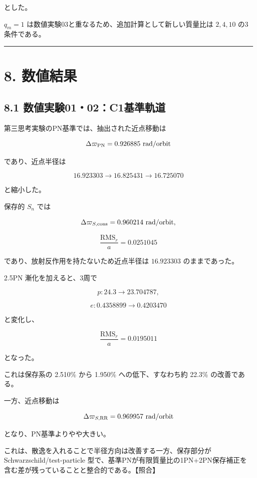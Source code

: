 \documentclass[
  a4paper,
]{ltjsarticle}
\begin{document}
とした。

\(q_m=1\) は数値実験03と重なるため、追加計算として新しい質量比は
\(2,4,10\) の3条件である。

\begin{center}\rule{0.5\linewidth}{0.5pt}\end{center}

\section{8. 数値結果}\label{ux6570ux5024ux7d50ux679c}

\subsection{8.1
数値実験01・02：C1基準軌道}\label{ux6570ux5024ux5b9fux9a130102c1ux57faux6e96ux8eccux9053}

第三思考実験のPN基準では、抽出された近点移動は

\[
\Delta\varpi_{\rm PN}=0.926885\ {\rm rad/orbit}
\]

であり、近点半径は

\[
16.923303
\rightarrow
16.825431
\rightarrow
16.725070
\]

と縮小した。

保存的 \(S_n\) では

\[
\Delta\varpi_{S,\rm cons}=0.960214\ {\rm rad/orbit},
\]

\[
\frac{\mathrm{RMS}_r}{a}=0.0251045
\]

であり、放射反作用を持たないため近点半径は \(16.923303\)
のままであった。

2.5PN 漸化を加えると、3周で

\[
p:
24.3\rightarrow23.704787,
\]

\[
e:
0.4358899\rightarrow0.4203470
\]

と変化し、

\[
\frac{\mathrm{RMS}_r}{a}
=0.0195011
\]

となった。

これは保存系の 2.510\% から 1.950\% への低下、すなわち約 22.3\%
の改善である。

一方、近点移動は

\[
\Delta\varpi_{S,\rm RR}=0.969957\ {\rm rad/orbit}
\]

となり、PN基準よりやや大きい。

これは、散逸を入れることで半径方向は改善する一方、保存部分が
Schwarzschild/test-particle
型で、基準PNが有限質量比の1PN+2PN保存補正を含む差が残っていることと整合的である。【照合】
\end{document}
